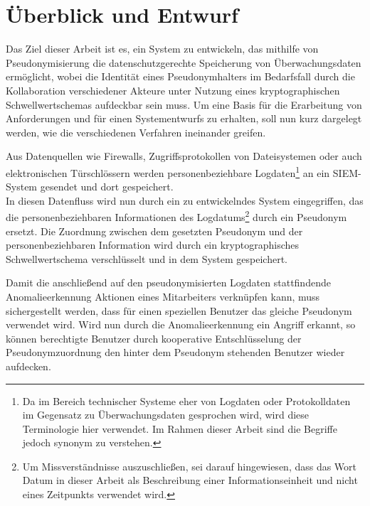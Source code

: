 \chapter{Überblick und Entwurf}
\label{cha_overview}

Das Ziel dieser Arbeit ist es, ein System zu entwickeln, das mithilfe von Pseudonymisierung die datenschutzgerechte Speicherung von Überwachungsdaten ermöglicht, wobei die Identität eines Pseudonymhalters im Bedarfsfall durch die Kollaboration verschiedener Akteure unter Nutzung eines kryptographischen Schwellwertschemas aufdeckbar sein muss. Um eine Basis für die Erarbeitung von Anforderungen und für einen Systementwurfs zu erhalten, soll nun kurz dargelegt werden, wie die verschiedenen Verfahren ineinander greifen. 

Aus Datenquellen wie Firewalls, Zugriffsprotokollen von Dateisystemen oder auch elektronischen Türschlössern werden personenbeziehbare Logdaten\footnote{
  Da im Bereich technischer Systeme eher von Logdaten oder Protokolldaten im Gegensatz zu Überwachungsdaten gesprochen wird, wird diese Terminologie hier verwendet. Im Rahmen dieser Arbeit sind die Begriffe jedoch synonym zu verstehen.
} an ein SIEM-System gesendet und dort gespeichert.\\
In diesen Datenfluss wird nun durch ein zu entwickelndes System eingegriffen, das die personenbeziehbaren Informationen des Logdatums\footnote{
  Um Missverständnisse auszuschließen, sei darauf hingewiesen, dass das Wort Datum in dieser Arbeit als Beschreibung einer Informationseinheit und nicht eines Zeitpunkts verwendet wird. 
} durch ein Pseudonym ersetzt. Die Zuordnung zwischen dem gesetzten Pseudonym und der personenbeziehbaren Information wird durch ein kryptographisches Schwellwertschema verschlüsselt und in dem System gespeichert.

Damit die anschließend auf den pseudonymisierten Logdaten stattfindende Anomalieerkennung Aktionen eines Mitarbeiters verknüpfen kann, muss sichergestellt werden, dass für einen speziellen Benutzer das gleiche Pseudonym verwendet wird. Wird nun durch die Anomalieerkennung ein Angriff erkannt, so können berechtigte Benutzer durch kooperative Entschlüsselung der Pseudonymzuordnung den hinter dem Pseudonym stehenden Benutzer wieder aufdecken.

